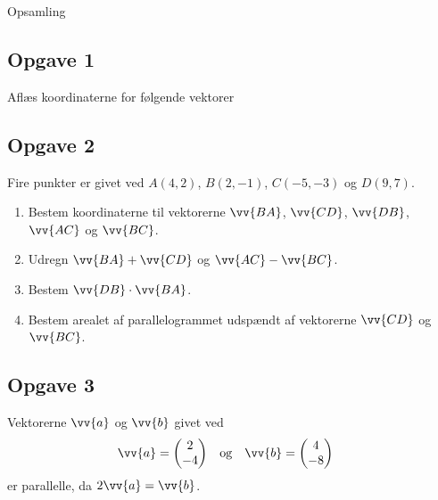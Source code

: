 \begin{center}
	\Huge
	Opsamling	
\end{center}

\subsection*{Opgave 1}
Aflæs koordinaterne for følgende vektorer
\begin{center}
\end{center}
\newpage
\subsection*{Opgave 2}
Fire punkter er givet ved $A(4,2)$, $B(2,-1)$, $C(-5,-3)$ og $D(9,7)$.
\begin{enumerate}[label=\roman*)]
	\item Bestem koordinaterne til vektorerne $\vv{BA}$, $\vv{CD}$, $\vv{DB}$, $\vv{AC}$ og $\vv{BC}$.
	\item Udregn $\vv{BA} + \vv{CD}$ og $\vv{AC} - \vv{BC}$.
	\item Bestem $\vv{DB}\cdot \vv{BA}$.
	\item Bestem arealet af parallelogrammet udspændt af vektorerne $\vv{CD}$ og $\vv{BC}$.
\end{enumerate}

\subsection*{Opgave 3}

Vektorerne $\vv{a}$ og $\vv{b}$ givet ved
\begin{align*}
	&\vv{a} =	
	\begin{pmatrix}
		2 \\ -4
	\end{pmatrix}
	&
	&\textnormal{og}
	&
	&\vv{b} =
	\begin{pmatrix}
		4 \\ -8
	\end{pmatrix}
\end{align*}
er parallelle, da $2\vv{a} = \vv{b}$.

